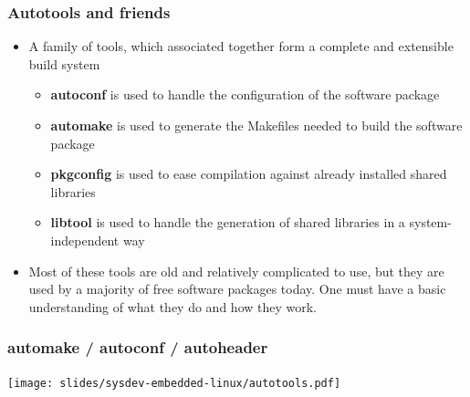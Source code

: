 \begin{frame}
  \frametitle{Autotools and friends}
  \begin{itemize}
  \item A family of tools, which associated together form a complete
    and extensible build system
    \begin{itemize}
    \item {\bf autoconf} is used to handle the configuration of the
      software package
    \item {\bf automake} is used to generate the Makefiles needed to
      build the software package
    \item {\bf pkgconfig} is used to ease compilation against already
      installed shared libraries
    \item {\bf libtool} is used to handle the generation of shared
      libraries in a system-independent way
    \end{itemize}
  \item Most of these tools are old and relatively complicated to use,
    but they are used by a majority of free software packages
    today. One must have a basic understanding of what they do and how
    they work.
  \end{itemize}
\end{frame}

\begin{frame}
  \frametitle{automake / autoconf / autoheader}
  \begin{center}
    \texttt{[image: slides/sysdev-embedded-linux/autotools.pdf]}
  \end{center}
\end{frame}

